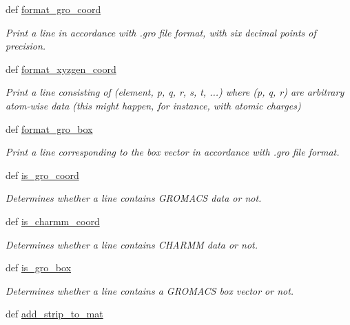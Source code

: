 \begin{DoxyCompactItemize}
def \hyperlink{namespaceforcebalance_1_1molecule_a41c13064e4285973aa6c49369d3d3390}{format\-\_\-gro\-\_\-coord}
\begin{DoxyCompactList}\small\item\em \-Print a line in accordance with .gro file format, with six decimal points of precision. \end{DoxyCompactList}\item 
def \hyperlink{namespaceforcebalance_1_1molecule_a4948e4662b8d2c8d515427d1bbb3d01e}{format\-\_\-xyzgen\-\_\-coord}
\begin{DoxyCompactList}\small\item\em \-Print a line consisting of (element, p, q, r, s, t, ...) where (p, q, r) are arbitrary atom-\/wise data (this might happen, for instance, with atomic charges) \end{DoxyCompactList}\item 
def \hyperlink{namespaceforcebalance_1_1molecule_ae25aa5331b3a2dd0e9d1e184380357db}{format\-\_\-gro\-\_\-box}
\begin{DoxyCompactList}\small\item\em \-Print a line corresponding to the box vector in accordance with .gro file format. \end{DoxyCompactList}\item 
def \hyperlink{namespaceforcebalance_1_1molecule_a12b7bb398c2fa49a223f258ec7737483}{is\-\_\-gro\-\_\-coord}
\begin{DoxyCompactList}\small\item\em \-Determines whether a line contains \-G\-R\-O\-M\-A\-C\-S data or not. \end{DoxyCompactList}\item 
def \hyperlink{namespaceforcebalance_1_1molecule_a838d85848bd817e801d0f5f6502217ef}{is\-\_\-charmm\-\_\-coord}
\begin{DoxyCompactList}\small\item\em \-Determines whether a line contains \-C\-H\-A\-R\-M\-M data or not. \end{DoxyCompactList}\item 
def \hyperlink{namespaceforcebalance_1_1molecule_aafc8c924eed4480fed8ddc9c474d3bc1}{is\-\_\-gro\-\_\-box}
\begin{DoxyCompactList}\small\item\em \-Determines whether a line contains a \-G\-R\-O\-M\-A\-C\-S box vector or not. \end{DoxyCompactList}\item 
def \hyperlink{namespaceforcebalance_1_1molecule_a4cdb2086978b281ed84cd66179c3f5b2}{add\-\_\-strip\-\_\-to\-\_\-mat}

\end{DoxyCompactItemize}
